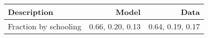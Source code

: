 \begin{tabular}{lrr}
\hline
Description & Model  & Data  \\
\hline
Fraction by schooling & 0.66, 0.20, 0.13  & 0.64, 0.19, 0.17  \\
\hline
\end{tabular}%
